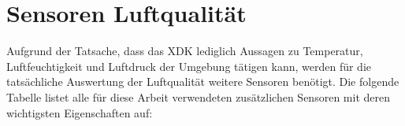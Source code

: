 \section{Sensoren Luftqualität}\label{sec:Sensoren Luftqualität}
Aufgrund der Tatsache, dass das \acs{XDK} lediglich Aussagen zu Temperatur, Luftfeuchtigkeit und Luftdruck der Umgebung tätigen kann, werden für die tatsächliche Auswertung der Luftqualität weitere Sensoren benötigt. Die folgende Tabelle listet alle für diese Arbeit verwendeten zusätzlichen Sensoren mit deren wichtigsten Eigenschaften auf:
\begin{table}[H]
	\begin{center}
	\end{center}
	\caption{Übersicht Sensoren}
	\label{tab:Sensoren}
\end{table}

